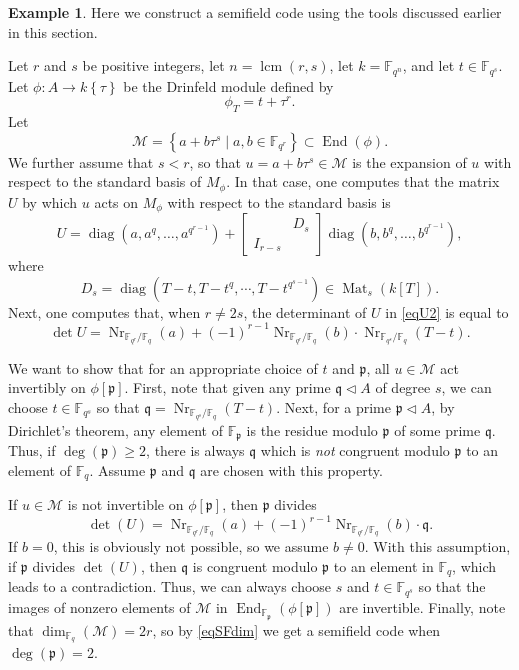 \documentclass[12pt]{amsart}
\theoremstyle{definition}
\newtheorem{example}[thm]{Example}
\theoremstyle{remark}
\numberwithin{equation}{section}
\numberwithin{thm}{section}
\DeclareMathOperator{\End}{End}
\DeclareMathOperator{\Mat}{Mat}
\DeclareMathOperator{\diag}{diag}
\DeclareMathOperator{\Nr}{Nr}
\DeclareMathOperator{\lcm}{lcm}
\newcommand{\fp}{\mathfrak{p}}
\newcommand{\fq}{\mathfrak{q}}
\newcommand{\cM}{\mathcal{M}}
\newcommand{\F}{\mathbb{F}}
\newcommand{\twist}[1]{#1\!\left\{\tau\right\}}
\begin{document}
\begin{example}\label{ssExample} Here we construct a semifield code using the tools discussed earlier in this section. 

Let $r$ and $s$ be positive integers, let $n=\lcm(r, s)$, let $k=\F_{q^n}$, and let $t\in \F_{q^s}$. 
Let $\phi\colon A\to \twist{k}$ be the Drinfeld module defined by 
$$\phi_T=t+\tau^r.$$ 
Let  
$$
\cM=\left\{ a+b\tau^s\mid a, b\in \F_{q^r}\right\} \subset \End(\phi). 
$$
We further assume that $s<r$, so that $u=a+b\tau^s\in \cM$ is the expansion of $u$ with respect to the standard basis of $M_\phi$. In that case,   
one computes that the matrix $U$ by which $u$ acts on $M_\phi$ with respect to the standard basis is  
\begin{equation}\label{eqU2}
	U=\diag(a, a^q, \dots, a^{q^{r-1}})+\begin{bmatrix} & D_{s}\\ I_{r-s} & \end{bmatrix}\diag(b, b^q, \dots, b^{q^{r-1}}), 
\end{equation}
where 
$$
D_s =\diag(T-t, T-t^q, \cdots, T-t^{q^{s-1}})\in \Mat_{s}(k[T]). 
$$
Next, one computes that, when $r\neq 2s$, the determinant of $U$ in \eqref{eqU2} is equal to 
$$
\det U =\Nr_{\F_{q^r}/\F_q}(a) +(-1)^{r-1} \Nr_{\F_{q^r}/\F_q}(b)\cdot \Nr_{\F_{q^s}/\F_q}(T-t).  %
$$

We want to show that for an appropriate choice of $t$ and $\fp$, all $u\in \cM$ act invertibly on $\phi[\fp]$. First, note that given any prime 
$\fq\lhd A$ of degree $s$, we can choose $t\in \F_{q^s}$ so that $\fq=\Nr_{\F_{q^s}/\F_q}(T-t)$. Next, for a prime $\fp\lhd A$, by Dirichlet's theorem, any element of $\F_\fp$ is the residue modulo $\fp$ of some prime $\fq$. Thus, if $\deg(\fp)\geq 2$, 
there is always $\fq$ which is \textit{not} congruent modulo $\fp$ 
to an element of $\F_q$. Assume $\fp$ and $\fq$ are chosen with this property.  

If $u\in \cM$ is not invertible on $\phi[\fp]$, then $\fp$ divides
$$\det(U)= \Nr_{\F_{q^r}/\F_q}(a) +(-1)^{r-1} \Nr_{\F_{q^r}/\F_q}(b)\cdot \fq.$$
 If $b=0$, this is obviously not possible, so we assume $b\neq 0$. With this assumption, if $\fp$ 
divides $\det(U)$, then $\fq$ is congruent modulo $\fp$ to an element in $\F_q$, which leads to a contradiction. Thus, we can always choose $s$ and $t\in \F_{q^s}$ 
so that the images of nonzero elements of $\cM$ in $\End_{\F_\fp}(\phi[\fp])$ are invertible. Finally, note that $\dim_{\F_q}(\cM)=2r$, so 
by \eqref{eqSFdim} we get a semifield code when $\deg(\fp)=2$. 
\end{example}
\end{document}
